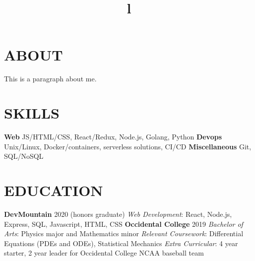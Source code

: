 \documentclass[margin]{resume}
\begin{document}
\begin{resume}


\section{ABOUT}
This is a paragraph about me.

\section{SKILLS}

\textbf{Web} JS/HTML/CSS, React/Redux, Node.js, Golang, Python\newline
\textbf{Devops} Unix/Linux, Docker/containers, serverless solutions, CI/CD\newline
\textbf{Miscellaneous} Git, SQL/NoSQL

\section{EDUCATION}
\textbf{DevMountain} 2020 (honors graduate)\newline
{\sl Web Development}: React, Node.js, Express, SQL, Javascript, HTML, CSS\newline
\textbf{Occidental College} 2019\newline
{\sl Bachelor of Arts}: Physics major and Mathematics minor\newline
{\sl Relevant Coursework}: Differential Equations (PDEs and ODEs), Statistical Mechanics\newline
{\sl Extra Curricular}: 4 year starter, 2 year leader for Occidental College NCAA baseball team


\begin{format}
\title{l}\\
\\
\body\\
\end{format}


\end{resume}
\end{document}
